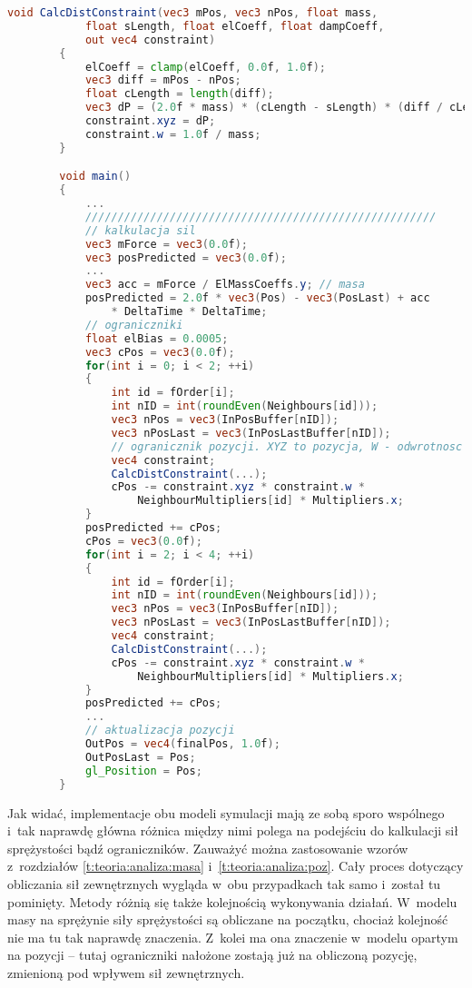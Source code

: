 		\begin{lstlisting}[language=GLSL,caption={Obliczanie przesunięcia -- model oparty na pozycji.},label={lst_5_2}]
		void CalcDistConstraint(vec3 mPos, vec3 nPos, float mass, 
			float sLength, float elCoeff, float dampCoeff,
			out vec4 constraint)
		{
			elCoeff = clamp(elCoeff, 0.0f, 1.0f);
			vec3 diff = mPos - nPos;
			float cLength = length(diff);
			vec3 dP = (2.0f * mass) * (cLength - sLength) * (diff / cLength) * elCoeff;
			constraint.xyz = dP;
			constraint.w = 1.0f / mass;
		}

		void main()
		{
			...
			//////////////////////////////////////////////////////
			// kalkulacja sil
			vec3 mForce = vec3(0.0f);
			vec3 posPredicted = vec3(0.0f);
			...
			vec3 acc = mForce / ElMassCoeffs.y;	// masa
			posPredicted = 2.0f * vec3(Pos) - vec3(PosLast) + acc 
				* DeltaTime * DeltaTime;
			// ograniczniki
			float elBias = 0.0005;
			vec3 cPos = vec3(0.0f);
			for(int i = 0; i < 2; ++i)
			{
				int id = fOrder[i];
				int nID = int(roundEven(Neighbours[id]));
				vec3 nPos = vec3(InPosBuffer[nID]);
				vec3 nPosLast = vec3(InPosLastBuffer[nID]);
				// ogranicznik pozycji. XYZ to pozycja, W - odwrotnosc masy
				vec4 constraint;
				CalcDistConstraint(...);
				cPos -= constraint.xyz * constraint.w * 
					NeighbourMultipliers[id] * Multipliers.x;
			}
			posPredicted += cPos;
			cPos = vec3(0.0f);
			for(int i = 2; i < 4; ++i)
			{
				int id = fOrder[i];
				int nID = int(roundEven(Neighbours[id]));
				vec3 nPos = vec3(InPosBuffer[nID]);
				vec3 nPosLast = vec3(InPosLastBuffer[nID]);
				vec4 constraint;
				CalcDistConstraint(...);
				cPos -= constraint.xyz * constraint.w * 
					NeighbourMultipliers[id] * Multipliers.x;
			}
			posPredicted += cPos;
			...
			// aktualizacja pozycji
			OutPos = vec4(finalPos, 1.0f);
			OutPosLast = Pos;
			gl_Position = Pos;
		}	
		\end{lstlisting}

		Jak widać, implementacje obu modeli symulacji mają ze sobą sporo wspólnego i~tak naprawdę główna różnica między nimi polega na podejściu do kalkulacji sił sprężystości bądź ograniczników. Zauważyć można zastosowanie wzorów z~rozdziałów \ref{t:teoria:analiza:masa} i~\ref{t:teoria:analiza:poz}. Cały proces dotyczący obliczania sił zewnętrznych wygląda w~obu przypadkach tak samo i~został tu pominięty. Metody różnią się także kolejnością wykonywania działań. W~modelu masy na sprężynie siły sprężystości są obliczane na początku, chociaż kolejność nie ma tu tak naprawdę znaczenia. Z~kolei ma ona znaczenie w~modelu opartym na pozycji -- tutaj ograniczniki nałożone zostają już na obliczoną pozycję, zmienioną pod wpływem sił zewnętrznych.
		
